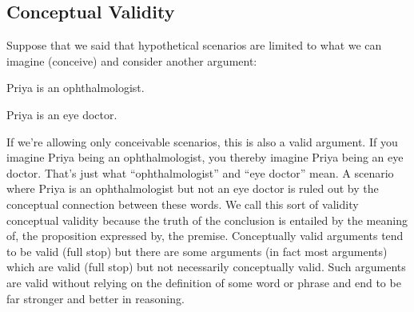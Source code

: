 \subsection{Conceptual Validity}
Suppose that we said that hypothetical scenarios are limited to what we can imagine (conceive) and consider another argument:
\begin{earg}
\item[]Priya is an ophthalmologist.
\item[\therefore] Priya is an eye doctor.
\end{earg}
If we’re allowing only conceivable scenarios, this is also a valid argument. If you imagine Priya being an ophthalmologist, you thereby imagine Priya being an eye doctor. That’s just what “ophthalmologist” and “eye doctor” mean. A scenario where Priya is an ophthalmologist but not an eye doctor is ruled out by the conceptual connection between these words. We call this sort of validity conceptual validity because the truth of the conclusion is entailed by the meaning of, the proposition expressed by, the premise. Conceptually valid arguments tend to be valid (full stop) but there are some arguments (in fact most arguments) which are valid (full stop) but not necessarily conceptually valid. Such arguments are valid without relying on the definition of some word or phrase and end to be far stronger and better in reasoning.
